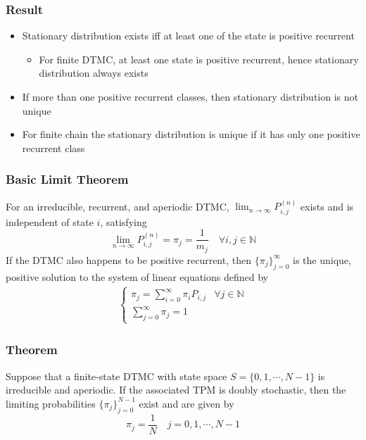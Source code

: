 \documentclass[11pt]{article}
\newcommand{\N}{{\mathbb{N}}}
\newcommand{\ds}{\displaystyle}
\begin{document}
\subsubsection*{Result}
\begin{itemize}
    \item Stationary distribution exists iff at least one of the state is positive recurrent
    \begin{itemize}
        \item For finite DTMC, at least one state is positive recurrent, hence stationary distribution always exists 
    \end{itemize}
    \item If more than one positive recurrent classes, then stationary distribution is not unique 
    \item For finite chain the stationary distribution is unique if it has only one positive recurrent class 
\end{itemize}
\subsubsection{Basic Limit Theorem}
For an irreducible, recurrent, and aperiodic DTMC, $\ds\lim_{n\to\infty}P_{i,j}^{(n)}$ exists 
and is independent of state $i$, satisfying 
\[\lim_{n\to\infty}P_{i,j}^{(n)}=\pi_j=\frac{1}{m_j}\quad\forall i,j\in\N\]    
If the DTMC also happens to be positive recurrent, then $\{\pi_j\}_{j=0}^{\infty}$ is the unique, positive solution
to the system of linear equations defined by 
\begin{align*}
    \begin{cases}
        \pi_j = \sum_{i=0}^{\infty}\pi_i P_{i,j} & \forall j\in\N \\
        \sum_{j=0}^{\infty}\pi_j = 1
    \end{cases}
\end{align*}
\subsubsection*{Theorem}
Suppose that a finite-state DTMC with state space $S=\{0,1,\cdots,N-1\}$ is irreducible and aperiodic.
If the associated TPM is doubly stochastic, then the limiting probabilities $\{\pi_j\}_{j=0}^{N-1}$ exist 
and are given by 
\[\pi_j = \frac{1}{N}\quad j=0,1,\cdots,N-1\]    
\end{document}
